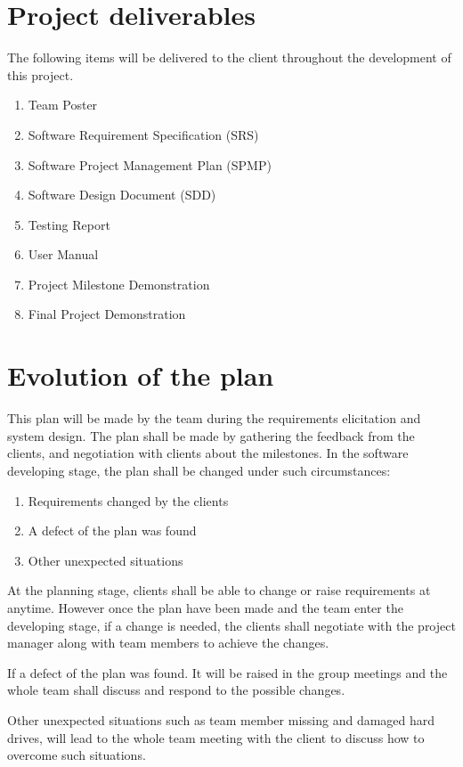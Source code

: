 \documentclass[11pt, a4paper]{report}
\begin{document}
\section{Project deliverables}
The following items will be delivered to the client throughout the development of this project.
\begin{enumerate}
	\item Team Poster
	\item Software Requirement Specification (SRS)
	\item Software Project Management Plan (SPMP)
	\item Software Design Document (SDD)
	\item Testing Report
	\item User Manual
	\item Project Milestone Demonstration
	\item Final Project Demonstration
\end{enumerate}


\section{Evolution of the plan}
This plan will be made by the team during the requirements elicitation and system design. The plan shall be made by gathering the feedback from the clients, and negotiation with clients about the milestones. In the software developing stage, the plan shall be changed under such circumstances:
\begin{enumerate}
	\item Requirements changed by the clients
	\item A defect of the plan was found
	\item Other unexpected situations
\end{enumerate}

At the planning stage, clients shall be able to change or raise requirements at anytime. However once the plan have been made and the team enter the developing stage, if a change is needed, the clients shall negotiate with the project manager along with team members to achieve the changes. 

If a defect of the plan was found. It will be raised in the group meetings and the whole team shall discuss and respond to the possible changes.

Other unexpected situations such as team member missing and damaged hard drives, will lead to the whole team meeting with the client to discuss how to overcome such situations. 
\end{document}
